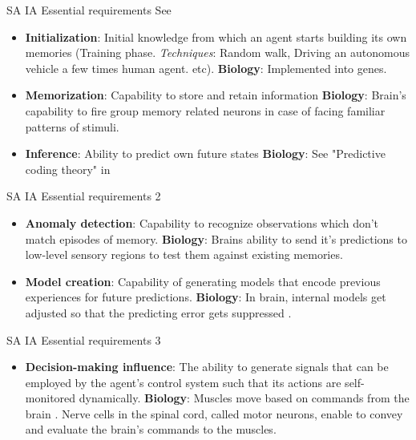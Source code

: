 \documentclass[unknownkeysallowed]{beamer}
\begin{document}
\begin{frame}{SA IA Essential requirements}
	See \textbf{
	\cite{regazzoni-2020-multi-sensorial-generative-and-descriptive-self-awareness-models-for-autonomous-systems}}
	\begin{itemize}
		\item \textbf{Initialization}: Initial knowledge from which an agent starts building its own memories (Training phase. \emph{Techniques}: Random walk, Driving an autonomous vehicle a few times human agent. etc). \textbf{Biology}: Implemented into genes.
		\item \textbf{Memorization}: Capability to store and retain information \textbf{Biology}: Brain's capability to fire group memory related neurons in case of facing familiar patterns of stimuli. 
		\item \textbf{Inference}: Ability to predict own future states \textbf{Biology}: See "Predictive coding theory" in \textbf{\cite{seth-2013-interoceptive-inference-emotion-and-the-embodied-self}}
	\end{itemize}
\end{frame}

\begin{frame}{SA IA Essential requirements 2}
	\begin{itemize}
		\item \textbf{Anomaly detection}: Capability to recognize observations which don't match episodes of memory. \textbf{Biology}: Brains ability to send it's predictions to low-level sensory regions to test them against existing memories.
		\item \textbf{Model creation}: Capability of generating models that encode previous experiences for future predictions. \textbf{Biology}: In brain, internal models get adjusted so that the predicting error gets suppressed \textbf{\cite{friston-2010-the-free-energy-principle-a-unified-brain-theory}}.
	\end{itemize}
\end{frame}

\begin{frame}{SA IA Essential requirements 3}
	\begin{itemize}
	\item \textbf{Decision-making influence}: The ability to generate signals that can be employed by the agent’s control system such that its actions are self-monitored dynamically. \textbf{Biology}: Muscles move based on commands from the brain \textbf{\cite{rizzolatti-1996-premotor-cortex-and-the-recognition-of-motor-actions}}. Nerve cells in the spinal cord, called motor neurons, enable to convey and evaluate the brain’s commands to the muscles.
	\end{itemize}
\end{frame}
\end{document}
